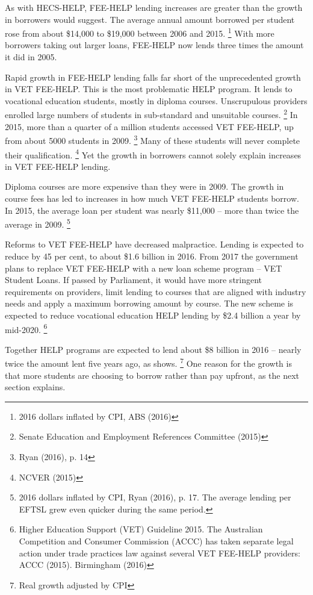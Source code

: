 \documentclass[embargoed]{grattan}
\begin{document}
As with HECS-HELP, FEE-HELP lending increases are greater than the growth in borrowers would suggest.
The average annual amount borrowed per student rose from about \$14,000 to \$19,000 between 2006 and 2015.%
\footnote{2016 dollars inflated by \gls{CPI}, ABS (2016)} With more borrowers taking out larger loans, FEE-HELP now lends three times the amount it did in 2005.

Rapid growth in FEE-HELP lending falls far short of the unprecedented growth in VET FEE-HELP.
This is the most problematic HELP program.
It lends to vocational education students, mostly in diploma courses.
Unscrupulous providers enrolled large numbers of students in sub-standard and unsuitable courses.%
\footnote{Senate Education and Employment References Committee (2015)} In 2015, more than a quarter of a million students accessed VET FEE-HELP, up from about 5000 students in 2009.%
\footnote{Ryan (2016), p. 14} Many of these students will never complete their qualification.%
\footnote{NCVER (2015)} Yet the growth in borrowers cannot solely explain increases in VET FEE-HELP lending.

Diploma courses are more expensive than they were in 2009.
The growth in course fees has led to increases in how much VET FEE-HELP students borrow.
In 2015, the average loan per student was nearly \$11,000 -- more than twice the average in 2009.%
\footnote{2016 dollars inflated by \gls{CPI}, Ryan (2016), p. 17.
The average lending per EFTSL grew even quicker during the same period.}

Reforms to VET FEE-HELP have decreased malpractice.
Lending is expected to reduce by 45 per cent, to about \$1.6 billion in 2016.
From 2017 the government plans to replace VET FEE-HELP with a new loan scheme program -- VET Student Loans.
If passed by Parliament, it would have more stringent requirements on providers, limit lending to courses that are aligned with industry needs and apply a maximum borrowing amount by course.
The new scheme is expected to reduce vocational education HELP lending by \$2.4 billion a year by mid-2020.%
\footnote{Higher Education Support (VET) Guideline 2015.
The Australian Competition and Consumer Commission (ACCC) has taken separate legal action under trade practices law against several VET FEE-HELP providers: ACCC (2015).
Birmingham (2016)}

Together HELP programs are expected to lend about \$8 billion in 2016 -- nearly twice the amount lent five years ago, as  shows.%
\footnote{Real growth adjusted by \gls{CPI}} One reason for the growth is that more students are choosing to borrow rather than pay upfront, as the next section explains.
\end{document}
